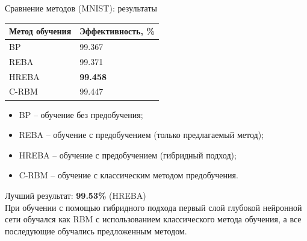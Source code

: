 \documentclass[10pt]{beamer}
\begin{document}
        \begin{frame}{Сравнение методов (MNIST): результаты}
            \begin{table} [!h]
              \small
            \centering
            \begin{tabular}{| p{3cm} | p{3cm} |}
              \hline
                \textbf{Метод обучения} & \textbf{Эффективность, \%}\\
                \hline
                BP & 99.367\\
                \hline
                REBA & 99.371\\
                \hline
                HREBA & \textbf{99.458}\\
                \hline
                C-RBM & 99.447\\
                \hline
            \end{tabular}
            \end{table}
            \begin{itemize}
                \item BP -- обучение без предобучения; 
                \item REBA -- обучение с предобучением (только предлагаемый метод); 
                \item HREBA -- обучение с предобучением (гибридный подход);
                \item C-RBM -- обучение с классическим методом предобучения.
            \end{itemize}
            Лучший результат: \textbf{99.53\%} (HREBA)\\
            
            При обучении с помощью гибридного подхода первый слой глубокой нейронной сети обучался как RBM с использованием классического метода обучения, а все последующие обучались предложенным методом.
        \end{frame}
\end{document}

